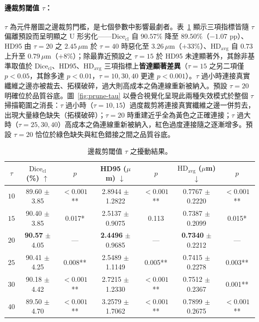 \paragraph{邊裁剪閾值 $\tau$：} $\tau$ 為元件層圖之邊裁剪門檻，是七個參數中影響最劇者。表~\ref{tab:param-prune} 顯示三項指標皆隨 $\tau$ 偏離預設而呈明顯之 U 形劣化——$\text{Dice}_{\text{cl}}$ 自 $90.57\%$ 降至 $89.50\%$（$-1.07$ pp）、HD95 由 $\tau = 20$ 之 $2.45\,\mu\text{m}$ 於 $\tau = 40$ 時惡化至 $3.26\,\mu\text{m}$（$+33\%$）、$\text{HD}_{\text{avg}}$ 自 $0.73$ 上升至 $0.79\,\mu\text{m}$（$+8\%$）；除最靠近預設之 $\tau = 15$ 於 HD95 未達顯著外，其餘非基準取值於 $\text{Dice}_{\text{cl}}$、HD95、$\text{HD}_{\text{avg}}$ 三項指標上\textbf{皆達顯著差異}（$\tau = 15$ 之另二項僅 $p < 0.05$，其餘多達 $p < 0.01$，$\tau = 10, 30, 40$ 更達 $p < 0.001$）。$\tau$ 過小時連接真實纖維之邊亦被裁去、拓樸破碎，過大則高成本之偽連線重新被納入。預設 $\tau = 20$ 明確位於品質谷底。圖~\ref{fig:prune-tau} 以疊合視覺化呈現此兩種失效模式於整個 $\tau$ 掃描範圍之消長：$\tau$ 過小時（$\tau = 10, 15$）過度裁剪將連接真實纖維之邊一併剪去，出現大量綠色缺失（拓樸破碎）；$\tau = 20$ 時重建近乎全為黃色之正確連接；$\tau$ 過大時（$\tau = 25, 30, 40$）高成本之偽連線重新被納入，紅色過度連接隨之逐漸增多。預設 $\tau = 20$ 恰位於綠色缺失與紅色錯接之間之品質谷底。

\begin{table}[htbp]
  \centering
  \caption{邊裁剪閾值 $\tau$ 之擾動結果。}
  \label{tab:param-prune}
  \small
  \setlength{\tabcolsep}{4pt}
  \begin{tabular}{ccccccc}
    \toprule
    $\tau$ & $\text{Dice}_{\text{cl}}$ (\%) $\uparrow$ & $p$ & HD95 ($\mu$m) $\downarrow$ & $p$ & $\text{HD}_{\text{avg}}$ ($\mu$m) $\downarrow$ & $p$ \\
    \midrule
    $10$ & 89.60 $\pm$ 3.85 & $<\!0.001$** & 2.8944 $\pm$ 1.2822 & $<\!0.001$** & 0.7767 $\pm$ 0.2220 & $<\!0.001$** \\
    $15$ & 90.40 $\pm$ 3.85 & 0.017* & 2.5137 $\pm$ 0.9075 & 0.113 & 0.7387 $\pm$ 0.2099 & 0.015* \\
    \textbf{$20$} & \textbf{90.57} $\pm$ 4.05 & --- & \textbf{2.4496} $\pm$ 0.9685 & --- & \textbf{0.7340} $\pm$ 0.2212 & --- \\
    $25$ & 90.41 $\pm$ 4.25 & 0.008** & 2.5489 $\pm$ 1.1149 & 0.005** & 0.7415 $\pm$ 0.2278 & 0.003** \\
    $30$ & 90.18 $\pm$ 4.42 & $<\!0.001$** & 2.7215 $\pm$ 1.2330 & $<\!0.001$** & 0.7512 $\pm$ 0.2367 & 0.001** \\
    $40$ & 89.50 $\pm$ 4.70 & $<\!0.001$** & 3.2579 $\pm$ 1.7062 & $<\!0.001$** & 0.7899 $\pm$ 0.2675 & $<\!0.001$** \\
    \bottomrule
  \end{tabular}
\end{table}

